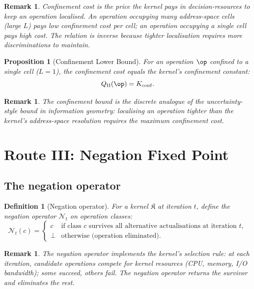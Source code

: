 \documentclass[twocolumn,11pt,a4paper]{article}
\newtheorem{proposition}[theorem]{Proposition}
\newtheorem{definition}[theorem]{Definition}
\newtheorem{remark}[theorem]{Remark}
\newcommand{\Kernel}{\mathfrak{K}}
\newcommand{\Qweight}{Q}
\newcommand{\Negation}{\mathcal{N}}
\begin{document}
\begin{remark}
Confinement cost is the price the kernel pays in decision-resources to keep an operation localised. An operation occupying many address-space cells (large $L$) pays low confinement cost per cell; an operation occupying a single cell pays high cost. The relation is inverse because tighter localisation requires more discriminations to maintain.
\end{remark}

\begin{proposition}[Confinement Lower Bound]
\label{prop:confinement-lb}
For an operation $\op$ confined to a single cell ($L = 1$), the confinement cost equals the kernel's confinement constant:
\[
\Qweight_\mathrm{II}(\op) = K_\mathrm{conf}.
\]
\end{proposition}

\begin{remark}
The confinement bound is the discrete analogue of the uncertainty-style bound in information geometry: localising an operation tighter than the kernel's address-space resolution requires the maximum confinement cost.
\end{remark}

\section{Route III: Negation Fixed Point}
\label{sec:route3}

\subsection{The negation operator}

\begin{definition}[Negation operator]
\label{def:negation}
For a kernel $\Kernel$ at iteration $t$, define the \emph{negation operator} $\Negation_t$ on operation classes:
\[
\Negation_t(c) = \begin{cases}
c & \text{if class } c \text{ survives all alternative actualisations at iteration } t,\\
\bot & \text{otherwise (operation eliminated).}
\end{cases}
\]
\end{definition}

\begin{remark}
The negation operator implements the kernel's selection rule: at each iteration, candidate operations compete for kernel resources (CPU, memory, I/O bandwidth); some succeed, others fail. The negation operator returns the survivor and eliminates the rest.
\end{remark}
\end{document}
